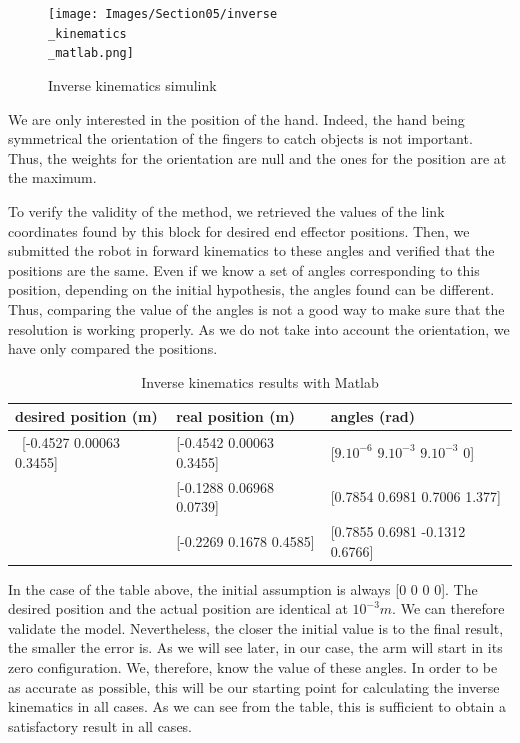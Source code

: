 \bigbreak
\begin{figure}[ht]
    \centering
    \texttt{[image: Images/Section05/inverse\\\_kinematics\\\_matlab.png]}
    \caption{Inverse kinematics simulink}
    \label{fig:InverseKinSimulink}
\end{figure}
\FloatBarrier

\bigbreak
We are only interested in the position of the hand. Indeed, the hand being symmetrical the orientation of the fingers to catch objects is not important. Thus, the weights for the orientation are null and the ones for the position are at the maximum.

\bigbreak
To verify the validity of the method, we retrieved the values of the link coordinates found by this block for desired end effector positions. Then, we submitted the robot in forward kinematics to these angles and verified that the positions are the same. Even if we know a set of angles corresponding to this position, depending on the initial hypothesis, the angles found can be different. Thus, comparing the value of the angles is not a good way to make sure that the resolution is working properly. As we do not take into account the orientation, we have only compared the positions.

\begin{table}[ht]
    \centering
    \begin{tabular}{|p{4.5cm} | p{4.5cm} | p{5cm}|} 
        \hline
        \textbf{desired position (m)} & \textbf{real position (m)} & \textbf{angles (rad)}\\ [0.3ex] 
        \hline\
        [-0.4527 0.00063 0.3455] & [-0.4542 0.00063 0.3455] & [$9.10^{-6}$ $9.10^{-3}$ $9.10^{-3}$ 0] \\ 
        \hline
        [-0.1286 0.06948 0.07537] & [-0.1288 0.06968 0.0739] & [0.7854  0.6981 0.7006 1.377] \\ 
        \hline
        [-0.2259 0.1668 0.4583] & [-0.2269 0.1678 0.4585] & [0.7855  0.6981  -0.1312 0.6766] \\ 
        \hline
    \end{tabular}
    \caption{Inverse kinematics results with Matlab}
\end{table}
\FloatBarrier

\bigbreak
In the case of the table above, the initial assumption is always [0 0 0 0]. The desired position and the actual position are identical at $10^{-3}m$. We can therefore validate the model. Nevertheless, the closer the initial value is to the final result, the smaller the error is. As we will see later, in our case, the arm will start in its zero configuration. We, therefore, know the value of these angles. In order to be as accurate as possible, this will be our starting point for calculating the inverse kinematics in all cases. As we can see from the table, this is sufficient to obtain a satisfactory result in all cases.


